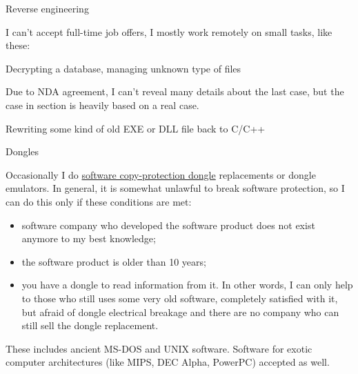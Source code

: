 \iffalse
\Large Need documentation? \normalsize

I could try to write a documentation/reference/manual for some API, language, framework, etc.

Sometimes I'm good at finding concise and clear example for each API/language feature.
This book is an example of it.
I can try to do this in long and steady fashion.

On the other side, my English is far from fluent.
And I may need a long time for diving deep into product unknown to me.

But I'll glad to rework existing documentation project.

Example of reference I admire is Wolfram Mathematica one: \url{http://reference.wolfram.com/language/}.
\fi

\Large Reverse engineering \normalsize

I can't accept full-time job offers, I mostly work remotely on small tasks, like these:

\large Decrypting a database, managing unknown type of files \normalsize

Due to NDA agreement, I can't reveal many details about the last case, but the case in  section
is heavily based on a real case.

\large Rewriting some kind of old EXE or DLL file back to C/C++ \normalsize

\large Dongles \normalsize

Occasionally I do \href{https://en.wikipedia.org/wiki/Software_protection_dongle}{software copy-protection dongle} replacements or dongle emulators. In general, it is somewhat unlawful to break software protection, so I can do this only if these conditions are met:

\begin{itemize}
\item software company who developed the software product does not exist anymore to my best knowledge;
\item the software product is older than 10 years;
\item you have a dongle to read information from it. In other words, I can only help to those who still uses some very old software, completely satisfied with it, but afraid of dongle electrical breakage and there are no company who can still sell the dongle replacement.
\end{itemize}

These includes ancient MS-DOS and UNIX software. Software for exotic computer architectures (like MIPS, DEC Alpha, PowerPC) accepted as well.

